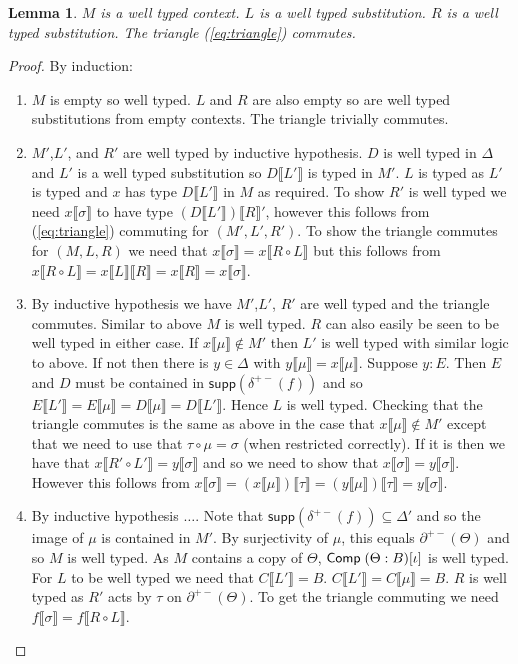 \documentclass[draft]{article}
\newtheorem{lemma}[theorem]{Lemma} \theoremstyle{definition}
\newcommand*{\Comp}[3]{\ensuremath\mathsf{Comp}\;(#1:#2)[#3]}
\newcommand*{\sub}[2]{\ensuremath{#1\llbracket #2 \rrbracket}}
\newcommand*{\supp}{\ensuremath{\mathsf{supp}}}
\begin{document}
\begin{lemma}
  \(M\) is a well typed context. \(L\) is a well typed substitution. \(R\) is a well typed substitution. The triangle (\ref{eq:triangle}) commutes.
\end{lemma}
\begin{proof}
  By induction:
  \begin{enumerate}
  \item \(M\) is empty so well typed. \(L\) and \(R\) are also empty so are well typed substitutions from empty contexts. The triangle trivially commutes.
  \item \(M'\),\(L'\), and \(R'\) are well typed by inductive hypothesis. \(D\) is well typed in \(\Delta\) and \(L'\) is a well typed substitution so \(\sub D {L'}\) is typed in \(M'\). \(L\) is typed as \(L'\) is typed and \(x\) has type \(\sub D {L'}\) in \(M\) as required. To show \(R'\) is well typed we need \(\sub x \sigma\) to have type \(\sub {(\sub D {L'})} R'\), however this follows from (\ref{eq:triangle}) commuting for \((M', L', R')\). To show the triangle commutes for \((M,L,R)\) we need that \(\sub x {\sigma} = \sub x {R \circ L}\) but this follows from \(\sub x {R \circ L} = \sub {\sub x L} R = \sub x R = \sub x \sigma\).
  \item By inductive hypothesis we have \(M'\),\(L'\), \(R'\) are well typed and the triangle commutes. Similar to above \(M\) is well typed. \(R\) can also easily be seen to be well typed in either case. If \(\sub x \mu \not\in M'\) then \(L'\) is well typed with similar logic to above. If not then there is \(y \in \Delta\) with \(\sub y \mu = \sub x \mu\). Suppose \(y : E\). Then \(E\) and \(D\) must be contained in \(\supp(\delta^{+-}(f))\) and so \(\sub E {L'} = \sub E \mu = \sub D \mu = \sub D {L'}\). Hence \(L\) is well typed. Checking that the triangle commutes is the same as above in the case that \(\sub x \mu \not \in M'\) except that we need to use that \(\tau \circ \mu = \sigma\) (when restricted correctly). If it is then we have that \(\sub x {R' \circ L'} = \sub y \sigma\) and so we need to show that \(\sub x \sigma = \sub y \sigma\). However this follows from \(\sub x \sigma = \sub {(\sub x \mu)} \tau = \sub {(\sub y \mu)} \tau = \sub y \sigma\).
  \item By inductive hypothesis \(\dots\). Note that \(\supp(\delta^{+-}(f)) \subseteq \Delta'\) and so the image of \(\mu\) is contained in \(M'\). By surjectivity of \(\mu\), this equals \(\partial^{+-}(\Theta)\) and so \(M\) is well typed. As \(M\) contains a copy of \(\Theta\), \(\Comp \Theta B \iota\) is well typed. For \(L\) to be well typed we need that \(\sub C {L'} = B\). \(\sub C {L'} = \sub C \mu = B\). \(R\) is well typed as \(R'\) acts by \(\tau\) on \(\partial^{+-}(\Theta)\). To get the triangle commuting we need \(\sub f \sigma = \sub f {R \circ L}\).

\end{enumerate}
\end{proof}
\end{document}
